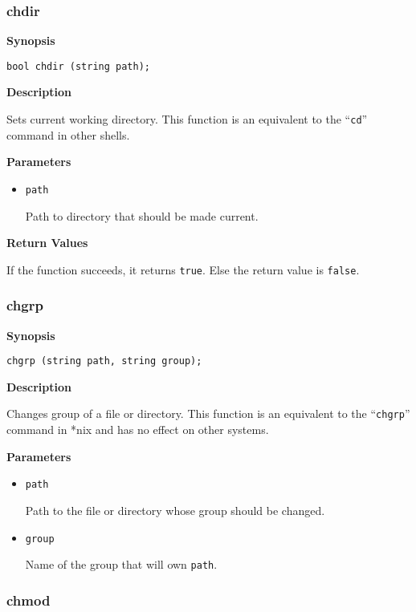 \documentclass[a4paper, 10pt, titlepage]{article}
\begin{document}
\subsubsection{chdir}

\textbf{Synopsis}

\begin{verbatim}
bool chdir (string path);
\end{verbatim}

\textbf{Description}

Sets current working directory. This function is an equivalent to the ``\texttt{cd}'' command in other shells.

\textbf{Parameters}

\begin{itemize}
\item \texttt{path}

Path to directory that should be made current.
\end{itemize}

\textbf{Return Values}

If the function succeeds, it returns \texttt{true}. Else the return value is \texttt{false}.

\subsubsection{chgrp}

\textbf{Synopsis}

\begin{verbatim}
chgrp (string path, string group);
\end{verbatim}

\textbf{Description}

Changes group of a file or directory. This function is an equivalent to the ``\texttt{chgrp}'' command in *nix and has no effect on other systems.

\textbf{Parameters}

\begin{itemize}
\item \texttt{path}

Path to the file or directory whose group should be changed.

\item \texttt{group}

Name of the group that will own \texttt{path}.
\end{itemize}

\subsubsection{chmod}
\end{document}
